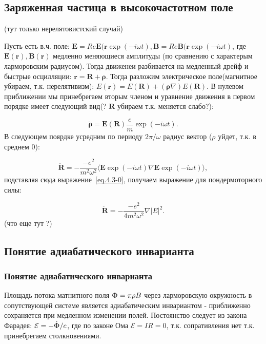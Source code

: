 \documentclass[10pt, a4paper]{article}
\begin{document}
\subsection{Заряженная частица в высокочастотном поле}
\label{sec.4.3}
(тут только нерелятовистский случай)

Пусть есть в.ч. поле: $\mathbf{E}=Re\mathbf{E}(\mathbf{r}\exp(-i\omega t), \mathbf{B}=Re\mathbf{B}(\mathbf{r}\exp(-i\omega t)$, где $\mathbf{E}(\mathbf{r}), \mathbf{B}(\mathbf{r})$ медленно меняющиеся амплитуды (по сравнению с характерым
ларморовским радиусом). Тогда движенеи разбивается на медленный дрейф и быстрые осцилляции: $\mathbf{r}=\mathbf{R}+\mathbf{\rho}$. 
Тогда разложим электрическое поле(магнитное убираем, т.к. нерелятивизм): $E(\mathbf{r})=E(\mathbf{R})+(\mathbf{\rho} \nabla)E(\mathbf{R})$. В нулевом приближении мы принебрегаем вторым членом и уравнение движения в первом порядке имеет 
следующий вид(? $\mathbf{R}$ убираем т.к. меняется слабо?):

\begin{equation}
    \label{eq.4.3-0}
    \ddot{\mathbf{\rho}}=\mathbf{E}(\mathbf{R}) \frac{e}{m} \exp(-i\omega t).
\end{equation}
В следующем поярдке усредним по периоду $2\pi/\omega$ радиус вектор ($\rho$ уйдет, т.к. в среднем 0):

\begin{equation}
    \label{eq.4.3-1}
    \ddot{\mathbf{R}}=-\frac{-e^2}{m^2 \omega^2}\langle \mathbf{E} \exp(-i\omega t) \nabla \mathbf{E} \exp(-i\omega t) \rangle, 
\end{equation}
подставляя сюда выражение~\ref{eq.4.3-0}, получаем выражение для пондермоторного силы:

\begin{equation}
    \label{eq.4.3pf}
    \ddot{\mathbf{R}}=-\frac{-e^2}{4 m^2 \omega^2} \nabla |E|^2.
\end{equation}
(что еще тут ?)

\subsection{Понятие адиабатического инварианта}
\label{sec.4.4}

\subsubsection{Понятие адиабатического инварианта}
\label{sec.4.4.1}
Площадь потока матнитного поля $\Upphi=\pi \rho B$ через ларморовскую окружность в сопутствующей системе является
адиабатическим инвариантом - приближенно сохраняется при медленном изменении полей. Постоянство следует из закона
Фарадея: $\mathcal{E}=-\dot{\Upphi}/c$, где по законе Ома $\mathcal{E}=IR=0$, т.к. сопративления нет т.к. принебрегаем
столкновениями.
\end{document}
